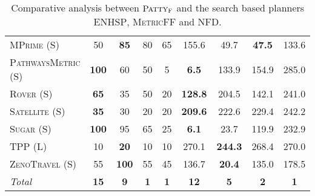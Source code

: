 \documentclass[11pt,landscape]{article}
\newcommand{\pattyf}{\ensuremath{\textsc{Patty}_\textsc{F}}\xspace}
\begin{document}
\begin{table}[tb]
{\begin{tabular}{|l||cccc||cccc||}
\textsc{MPrime} (S)&50&\textbf{85}&80&65&155.6&49.7&\textbf{47.5}&133.6\\
\textsc{PathwaysMetric} (S)&\textbf{100}&60&50&5&\textbf{6.5}&133.9&154.9&285.0\\
\textsc{Rover} (S)&\textbf{65}&35&50&20&\textbf{128.8}&204.5&142.1&241.0\\
\textsc{Satellite} (S)&\textbf{35}&30&20&20&\textbf{209.6}&222.6&229.4&242.2\\
\textsc{Sugar} (S)&\textbf{100}&95&65&25&\textbf{6.1}&23.7&119.9&232.9\\
\textsc{TPP} (L)&10&\textbf{20}&10&10&270.1&\textbf{244.3}&268.4&270.0\\
\textsc{ZenoTravel} (S)&55&\textbf{100}&55&45&136.7&\textbf{20.4}&135.0&178.5
\\\hline
\textit{Total}&\textbf{15}&\textbf{9}&\textbf{1}&\textbf{1}&\textbf{12}&\textbf{5}&\textbf{2}&\textbf{1}\\\hline

        \end{tabular}}
        \caption{Comparative analysis between \pattyf and the search based planners \textsc{ENHSP}, \textsc{MetricFF} and \textsc{NFD}.}
        \label{tab:exp-search}
        \end{table}
        
\end{document}
